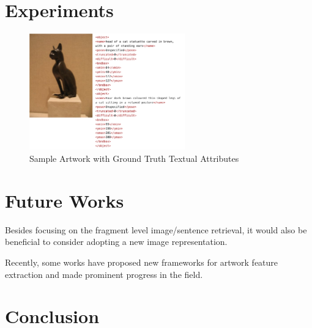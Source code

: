\section{Experiments}

\begin{figure}[h!]
\centering
\includegraphics[width=0.6\textwidth]{sampledata.pdf}
\caption{Sample Artwork with Ground Truth Textual Attributes}
\label{fig:sampledata}
\end{figure}

\section{Future Works}
Besides focusing on the fragment level image/sentence retrieval, it would also be beneficial to consider adopting a new image representation. 

Recently, some works \cite{TranslatingArtworks,parttowhole,Art2Real} have proposed new frameworks for artwork feature extraction and made prominent progress in the field. 


\section{Conclusion}


